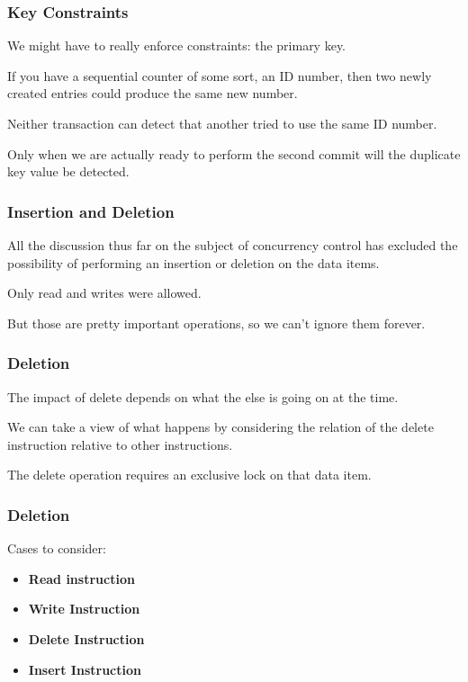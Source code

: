 \begin{frame}
\frametitle{Key Constraints}
We might have to really enforce constraints: the primary key. 

If you have a sequential counter of some sort, an ID number, then two newly created entries could produce the same new number. 

Neither transaction can detect that another tried to use the same ID number. 

Only when we are actually ready to perform the second commit will the duplicate key value be detected.


\end{frame}

\begin{frame}
\frametitle{Insertion and Deletion}

All the discussion thus far on the subject of concurrency control has excluded the possibility of performing an insertion or deletion on the data items. 

Only read and writes were allowed. 

But those are pretty important operations, so we can't ignore them forever. 


\end{frame}

\begin{frame}
\frametitle{Deletion}

The impact of delete depends on what the else is going on at the time. 

We can take a view of what happens by considering the relation of the delete instruction relative to other instructions. 

The delete operation requires an exclusive lock on that data item.

\end{frame}


\begin{frame}
\frametitle{Deletion}

Cases to consider:

\begin{itemize}
	\item \textbf{Read instruction}
	\item \textbf{Write Instruction}	
	\item \textbf{Delete Instruction}
	\item \textbf{Insert Instruction}
\end{itemize}


\end{frame}

